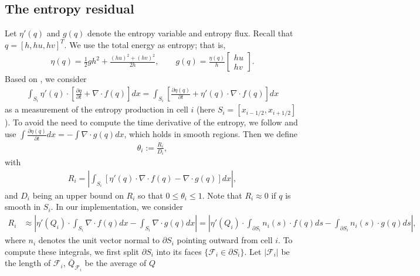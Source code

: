\documentclass[preprint, 11pt]{article}
\newcommand{\imh}{{i-1/2}}
\newcommand{\iph}{{i+1/2}}
\newcommand{\bff}{{f}}
\newcommand{\entvar}{\eta'}
\newcommand{\bfq}{{Q}}
\newcommand{\bfx}{{x}}
\newcommand{\bfs}{{s}}
\newcommand{\bfn}{{n}}
\newcommand{\f}{{\mathcal{F}}}
\newcommand{\entflux}{g}
\begin{document}
\subsection{The entropy residual}\label{sec:entres}
Let $\entvar(q)$ and $\entflux(q)$ denote the entropy variable and entropy flux.
Recall that $q=[h,hu,hv]^T$. We use the total energy as entropy; that is, 
\begin{align*}
  \eta(q)=\frac{1}{2} gh^2 + \frac{(hu)^2+(hv)^2}{2h}, \qquad
  \entflux(q)=
    \frac{\eta(q)}{h}
    \begin{bmatrix} hu \\ hv \end{bmatrix}.
\end{align*}
Based on \cite{guermond2011entropy}, we consider
\begin{align}\label{ent_residual}
  \int_{S_i} \entvar(q) \cdot \left[ \frac{\partial q}{\partial t} + \nabla\cdot \bff(q)\right]d\bfx
  =\int_{S_i} \left[\frac{\partial \eta(q)}{\partial t} + \entvar(q) \cdot \nabla\cdot \bff(q)\right] d\bfx
\end{align}
as a measurement of the entropy production in cell $i$ (here $S_i=[x_\imh,x_\iph]$).
To avoid the need to compute the time derivative of the entropy, we follow
\cite{guermond2018second, guermond2018well} and use
$\int \frac{\partial\eta(q)}{\partial t}d\bfx=-\int \nabla\cdot\entflux(q) d\bfx$,
which holds in smooth regions. Then we define
\begin{align}\label{Ri}
  \theta_i := \frac{R_i}{D_i},
\end{align}
with
\begin{align*}
  R_i=
  \left|\int_{S_i} \left[\entvar(q) \cdot \nabla\cdot \bff(q) - \nabla\cdot\entflux(q) \right] d\bfx\right|,
\end{align*}
and $D_i$ being an upper bound on $R_i$ so that $0\leq \theta_i\leq 1$.
Note that $R_i\approx 0$ if $q$ is smooth in $S_i$.
In our implementation, we consider
\begin{align}
  R_i 
  &\approx 
  \left|\entvar(\bfq_i)\cdot \int_{S_i}\nabla\cdot \bff(q)d\bfx
  -\int_{S_i}\nabla\cdot\entflux(q) d\bfx\right| 
  = 
  \left|\entvar(\bfq_i)\cdot \int_{\partial S_i}\bfn_i(s) \cdot \bff(q) d\bfs
  -\int_{\partial S_i}\bfn_i(s)\cdot\entflux(q) d\bfs\right|,
\end{align}
where $\bfn_i$ denotes the unit vector normal to $\partial S_i$ pointing outward from cell $i$. 
To compute these integrals, we first split $\partial S_i$ into its faces $\{\f_i\in\partial S_i\}$.
Let $|\f_i|$ be the length of $\f_i$, $\bar Q_{\f_i}$ be the average of $Q$ 
\end{document}

